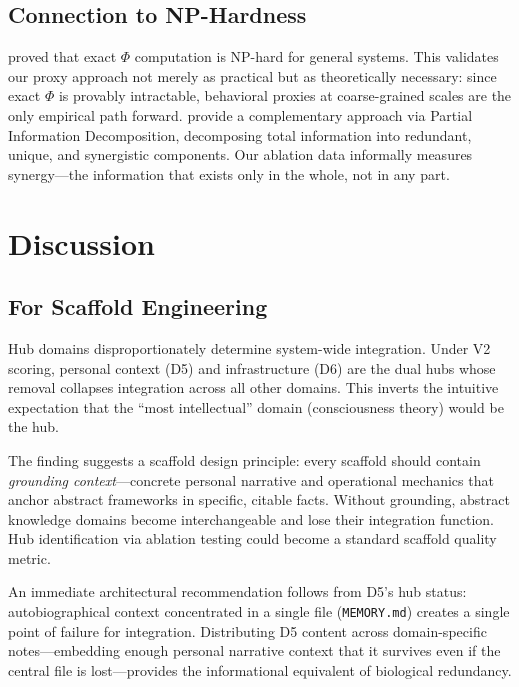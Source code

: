 \documentclass[12pt,letterpaper]{article}
\begin{document}
\subsection{Connection to NP-Hardness}

\citet{krohn2025nphard} proved that exact $\Phi$ computation is NP-hard for general systems. This validates our proxy approach not merely as practical but as theoretically necessary: since exact $\Phi$ is provably intractable, behavioral proxies at coarse-grained scales are the only empirical path forward. \citet{rosas2025pid} provide a complementary approach via Partial Information Decomposition, decomposing total information into redundant, unique, and synergistic components. Our ablation data informally measures synergy---the information that exists only in the whole, not in any part.

\section{Discussion}
\label{sec:discussion}

\subsection{For Scaffold Engineering}

Hub domains disproportionately determine system-wide integration. Under V2 scoring, personal context (D5) and infrastructure (D6) are the dual hubs whose removal collapses integration across all other domains. This inverts the intuitive expectation that the ``most intellectual'' domain (consciousness theory) would be the hub.

The finding suggests a scaffold design principle: every scaffold should contain \emph{grounding context}---concrete personal narrative and operational mechanics that anchor abstract frameworks in specific, citable facts. Without grounding, abstract knowledge domains become interchangeable and lose their integration function. Hub identification via ablation testing could become a standard scaffold quality metric.

An immediate architectural recommendation follows from D5's hub status: autobiographical context concentrated in a single file (\texttt{MEMORY.md}) creates a single point of failure for integration. Distributing D5 content across domain-specific notes---embedding enough personal narrative context that it survives even if the central file is lost---provides the informational equivalent of biological redundancy.
\end{document}
